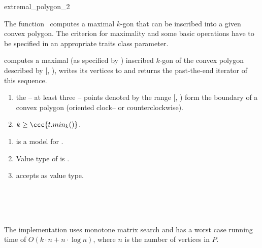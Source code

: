 \begin{ccRefFunction}{extremal_polygon_2}
  \begin{ccAdvanced}
    
    \ccDefinition The function \ccRefName\ computes a maximal $k$-gon
    that can be inscribed into a given convex polygon. The criterion
    for maximality and some basic operations have to be specified in
    an appropriate traits class parameter.
    

    \def\ccLongParamLayout{\ccTrue} 
    
    
    computes a maximal (as specified by ) inscribed $k$-gon of
    the convex polygon described by [,
    ), writes its vertices to  and returns the
    past-the-end iterator of this sequence.
    
    \ccPrecond
    \begin{enumerate}
    \item the -- at least three -- points denoted by the range
      [, ) form the boundary of a
      convex polygon (oriented clock-- or counterclockwise).
    \item $k \ge \ccc{t.min_k()}$.
    \end{enumerate}
    
    \ccRequire
    \begin{enumerate}
    \item {} is a model for .
    \item Value type of  is .
    \item {} accepts  as value
      type.
    \end{enumerate}

    \ccSeeAlso
    \\
    \\
    \\
    
    \ccImplementation The implementation uses monotone matrix search
    \cite{akmsw-gamsa-87} and has a worst case running time of $O(k
    \cdot n + n \cdot \log n)$, where $n$ is the number of vertices in
    $P$.
  \end{ccAdvanced}
\end{ccRefFunction}

